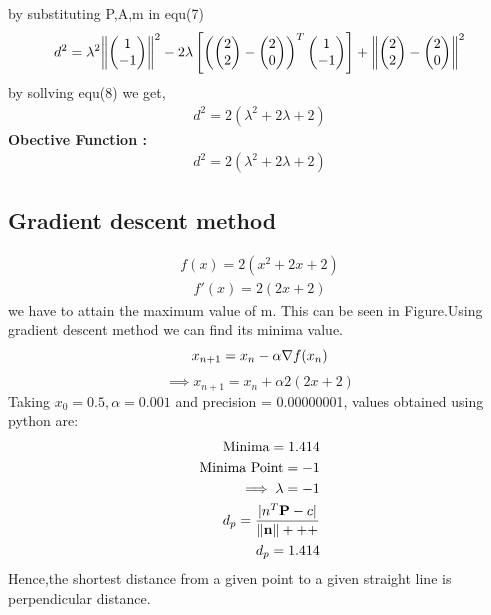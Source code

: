 \documentclass[10pt, a4paper]{article}
\newcommand{\myvec}[1]{\ensuremath{\begin{pmatrix}#1\end{pmatrix}}}
\let\vec\mathbf
\begin{document}
by substituting P,A,m in equ(7)
\begin{align}
d^2 = \lambda^2\norm{\myvec{1\\-1}}^2-2\lambda\left[\left (\myvec{2\\2}-\myvec{2\\0}\right)^T\myvec{1\\-1}\right]
+\norm{\myvec{2\\2}-\myvec{2\\0}}^2
\end{align}
by sollving equ(8) we get,
\begin{align}
d^2=2(\lambda^2+2\lambda+2)
\end{align}
\textbf{Obective Function :}
\begin{align}
d^2=2(\lambda^2+2\lambda+2)
\end{align}

    \subsection*{\normalsize Gradient descent method}
    
    \begin{align}
	\label{eq:vol_varx}
	f(x) = 2(x^2+2x+2)
\end{align}
\begin{align}   
    f'(x) = 2(2x+2)
	\end{align}
we have to attain the maximum value of m. This can be seen in Figure.Using gradient descent method we can find its minima value.
\begin{equation}
        x_{n+1} = x_n - \alpha \nabla f(x_n) \\
\end{equation}
\vspace{1mm}
\begin{equation}
\implies x_{n+1}=x_n+\alpha2(2x+2)
\end{equation}
Taking $x_0=0.5,\alpha=0.001$ and precision = 0.00000001, values obtained using python are:
    \begin{align}
        \text{Minima} = 1.414\\        
        \text{Minima Point} = -1\\
        \implies \lambda=-1\\
         d_p=\frac{|n^T\vec{P}-c|}{\norm{\vec{n}}+++}\\
         d_p = 1.414 
    \end{align}
Hence,the shortest distance from a given point to a given straight line is perpendicular distance.    
   
\end{document}
